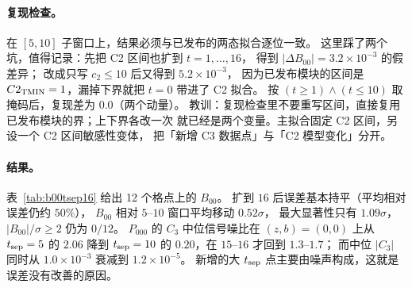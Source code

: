 \documentclass[UTF8,a4paper,11pt]{ctexart}
\begin{document}
\paragraph{复现检查。}
在 $[5,10]$ 子窗口上，结果必须与已发布的两态拟合逐位一致。
这里踩了两个坑，值得记录：先把 C2 区间也扩到 $t=1,\dots,16$，
得到 $|\Delta B_{00}|=3.2\times10^{-3}$ 的假差异；
改成只写 $c_2\le10$ 后又得到 $5.2\times10^{-3}$，
因为已发布模块的区间是 $C2_{\rm TMIN}=1$，漏掉下界就把 $t=0$ 带进了 C2 拟合。
按 $(t\ge1)\wedge(t\le10)$ 取掩码后，复现差为 $\mathbf{0.0}$（两个动量）。
教训：复现检查里不要重写区间，直接复用已发布模块的界；上下界各改一次
就已经是两个变量。主拟合固定 C2 区间，另设一个 C2 区间敏感性变体，
把「新增 C3 数据点」与「C2 模型变化」分开。

\paragraph{结果。}
表~\ref{tab:b00tsep16} 给出 12 个格点上的 $B_{00}$。
扩到 $16$ 后误差基本持平（平均相对误差仍约 $50\%$），
$B_{00}$ 相对 $5$--$10$ 窗口平均移动 $0.52\sigma$，
最大显著性只有 $1.09\sigma$，$|B_{00}|/\sigma\ge2$ 仍为 $0/12$。
$P_{000}$ 的 $C_3$ 中位信号噪比在 $(z,b)=(0,0)$ 上从 $t_{\rm sep}=5$ 的 $2.06$
降到 $t_{\rm sep}=10$ 的 $0.20$，在 $15$--$16$ 才回到 $1.3$--$1.7$；
而中位 $|C_3|$ 同时从 $1.0\times10^{-3}$ 衰减到 $1.2\times10^{-5}$。
新增的大 $t_{\rm sep}$ 点主要由噪声构成，这就是误差没有改善的原因。
\end{document}
